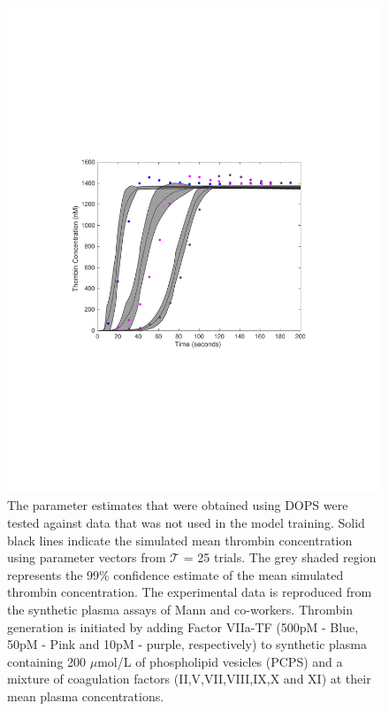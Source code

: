 \documentclass{bmcart}
\def\texttt{[image: ]}
\begin{document}
\begin{backmatter}
\begin{figure}[h!]
\centering
\includegraphics[trim = {3cm 6cm 3cm 6cm }, clip,width=1.0\textwidth]{./rachelfigs/ReplicateFigure6DivBySqrtN.pdf}
\caption{ The parameter estimates that were obtained using DOPS were tested against data that was not used in the model training. Solid black lines indicate the simulated mean thrombin concentration using parameter vectors from $\mathcal{T}$ = 25 trials. The grey shaded region represents the 99\% confidence estimate of the mean simulated thrombin concentration. The experimental data is reproduced from the synthetic plasma assays of Mann and co-workers. Thrombin generation is initiated by adding Factor VIIa-TF (500pM - Blue, 50pM - Pink and 10pM - purple, respectively) to synthetic plasma containing 200 $\mu$mol/L of phospholipid vesicles (PCPS) and a mixture of coagulation factors (II,V,VII,VIII,IX,X and XI) at their mean plasma concentrations.
}\label{fig-validation}
\end{figure}


\end{backmatter}
\end{document}
